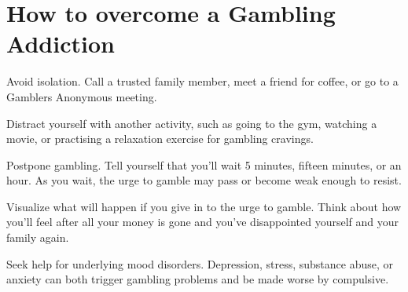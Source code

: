 \documentclass{article}
\begin{document}
\section{How to overcome a Gambling Addiction}


Avoid isolation. Call a trusted family member, meet a friend for coffee, or go to a Gamblers Anonymous meeting.



Distract yourself with another activity, such as going to the gym, watching a movie, or practising a relaxation exercise for gambling cravings.



Postpone gambling. Tell yourself that you'll wait 5 minutes, fifteen minutes, or an hour. As you wait, the urge to gamble may pass or become weak enough to resist.


Visualize what will happen if you give in to the urge to gamble. Think about how you'll feel after all your money is gone and you've disappointed yourself and your family again.



Seek help for underlying mood disorders. Depression,  stress, substance abuse, or anxiety can both trigger gambling problems and be made worse by compulsive. 
\end{document}

